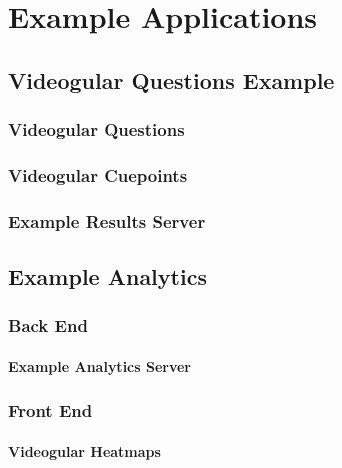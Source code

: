 \chapter{Example Applications} 
\label{Chapter: Example Applications}

\section{Videogular Questions Example} 
\label{Section:Videogular Questions Example}

\subsection{Videogular Questions}
\label{Subsection:Videogular Questions in example}

\subsection{Videogular Cuepoints}
\label{Subsection:Videogular Cuepoints in example}

\subsection{Example Results Server}
\label{Subsection:Example Results Server in example}


\section{Example Analytics}

\subsection{Back End}
\subsubsection{Example Analytics Server}
\label{Subsubsection:Analytics server in example}

\subsection{Front End}
\subsubsection{Videogular Heatmaps}
\label{Subsubsection:Videogular Heatmaps in example}